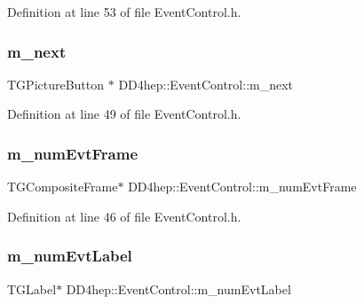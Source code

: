 Definition at line 53 of file Event\+Control.\+h.

\hypertarget{class_d_d4hep_1_1_event_control_a238b8108eaa10db3e1b50872795cd9a6}{}\label{class_d_d4hep_1_1_event_control_a238b8108eaa10db3e1b50872795cd9a6} 
\subsubsection{\texorpdfstring{m\+\_\+next}{m\_next}}
{\footnotesize\ttfamily T\+G\+Picture\+Button $\ast$ D\+D4hep\+::\+Event\+Control\+::m\+\_\+next\hspace{0.3cm}{\ttfamily [private]}}



Definition at line 49 of file Event\+Control.\+h.

\hypertarget{class_d_d4hep_1_1_event_control_a0c4a8e3502931ab1b993054ef87942c7}{}\label{class_d_d4hep_1_1_event_control_a0c4a8e3502931ab1b993054ef87942c7} 
\subsubsection{\texorpdfstring{m\+\_\+num\+Evt\+Frame}{m\_numEvtFrame}}
{\footnotesize\ttfamily T\+G\+Composite\+Frame$\ast$ D\+D4hep\+::\+Event\+Control\+::m\+\_\+num\+Evt\+Frame\hspace{0.3cm}{\ttfamily [private]}}



Definition at line 46 of file Event\+Control.\+h.

\hypertarget{class_d_d4hep_1_1_event_control_aa88e023fadd68daabea42dad9aa4cbe6}{}\label{class_d_d4hep_1_1_event_control_aa88e023fadd68daabea42dad9aa4cbe6} 
\subsubsection{\texorpdfstring{m\+\_\+num\+Evt\+Label}{m\_numEvtLabel}}
{\footnotesize\ttfamily T\+G\+Label$\ast$ D\+D4hep\+::\+Event\+Control\+::m\+\_\+num\+Evt\+Label\hspace{0.3cm}{\ttfamily [private]}}



